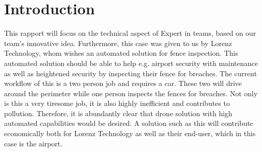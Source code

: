 \documentclass[../Head/Main.tex]{subfiles}
\begin{document}
\section{Introduction}
\label{sec:introduction}

This rapport will focus on the technical aspect of Expert in teams, based on our team's innovative idea. Furthermore, this case was given to us by Lorenz Technology, whom wishes an automated solution for fence inspection. This automated solution should be able to help e.g. airport security with maintenance as well as heightened security by inspecting their fence for breaches. The current workflow of this is a two person job and requires a car. These two will drive around the perimeter while one person inspects the fences for breaches. Not only is this a very tiresome job, it is also highly inefficient and contributes to pollution. Therefore, it is abundantly clear that drone solution with high automated capabilities would be desired. A solution such as this will contribute economically both for Lorenz Technology as well as their end-user, which in this case is the airport. 
\end{document}
